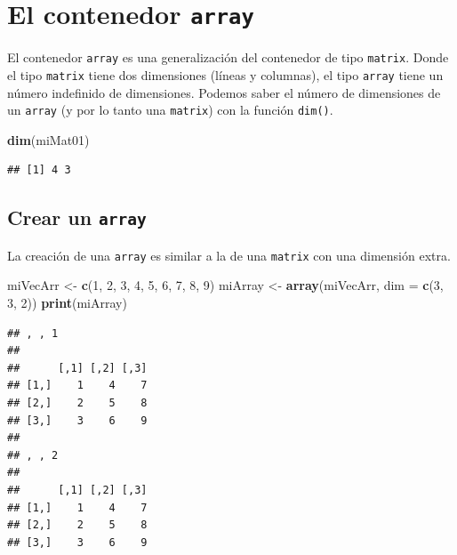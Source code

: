 \documentclass[]{book}
\newenvironment{Shaded}{\begin{snugshade}}{\end{snugshade}}
\newcommand{\KeywordTok}[1]{\textcolor[rgb]{0.13,0.29,0.53}{\textbf{#1}}}
\newcommand{\DataTypeTok}[1]{\textcolor[rgb]{0.13,0.29,0.53}{#1}}
\newcommand{\DecValTok}[1]{\textcolor[rgb]{0.00,0.00,0.81}{#1}}
\newcommand{\StringTok}[1]{\textcolor[rgb]{0.31,0.60,0.02}{#1}}
\newcommand{\NormalTok}[1]{#1}
\begin{document}
\section{\texorpdfstring{El contenedor
\texttt{array}}{El contenedor array}}\label{l014array}

El contenedor \texttt{array} es una generalización del contenedor de
tipo \texttt{matrix}. Donde el tipo \texttt{matrix} tiene dos
dimensiones (líneas y columnas), el tipo \texttt{array} tiene un número
indefinido de dimensiones. Podemos saber el número de dimensiones de un
\texttt{array} (y por lo tanto una \texttt{matrix}) con la función
\texttt{dim()}.

\begin{Shaded}
\begin{Highlighting}[]
\KeywordTok{dim}\NormalTok{(miMat01)}
\end{Highlighting}
\end{Shaded}

\begin{verbatim}
## [1] 4 3
\end{verbatim}

\subsection{\texorpdfstring{Crear un
\texttt{array}}{Crear un array}}\label{crear-un-array}

La creación de una \texttt{array} es similar a la de una \texttt{matrix}
con una dimensión extra.

\begin{Shaded}
\begin{Highlighting}[]
\NormalTok{miVecArr <-}\StringTok{ }\KeywordTok{c}\NormalTok{(}\DecValTok{1}\NormalTok{, }\DecValTok{2}\NormalTok{, }\DecValTok{3}\NormalTok{, }\DecValTok{4}\NormalTok{, }\DecValTok{5}\NormalTok{, }\DecValTok{6}\NormalTok{, }\DecValTok{7}\NormalTok{, }\DecValTok{8}\NormalTok{, }\DecValTok{9}\NormalTok{)}
\NormalTok{miArray <-}\StringTok{ }\KeywordTok{array}\NormalTok{(miVecArr, }\DataTypeTok{dim =} \KeywordTok{c}\NormalTok{(}\DecValTok{3}\NormalTok{, }\DecValTok{3}\NormalTok{, }\DecValTok{2}\NormalTok{))}
\KeywordTok{print}\NormalTok{(miArray)}
\end{Highlighting}
\end{Shaded}

\begin{verbatim}
## , , 1
## 
##      [,1] [,2] [,3]
## [1,]    1    4    7
## [2,]    2    5    8
## [3,]    3    6    9
## 
## , , 2
## 
##      [,1] [,2] [,3]
## [1,]    1    4    7
## [2,]    2    5    8
## [3,]    3    6    9
\end{verbatim}
\end{document}
